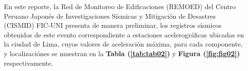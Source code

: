 \documentclass[11pt, a4paper]{report}
\begin{document}
\begin{figure}[H]
\begin{multicols}{2}
        \begin{minipage}[c]{8.2cm}
            \centering %
            \setlength\fboxsep{0pt}
            \setlength\fboxrule{0.3pt}
              \label{fig:fig01}
        \end{minipage}
    \end{multicols} 
\end{figure}

\vspace{1cm}

\noindent
En este reporte, la Red de Monitoreo de Edificaciones (REMOED) del Centro Peruano Japonés de Investigaciones Sísmicas y Mitigación
de Desastres (CISMID) FIC-UNI presenta de manera preliminar, los registros sísmicos obtenidos de este evento correspondiente a 
 estaciones acelerográficas ubicadas en la ciudad de Lima, cuyos valores de aceleración máxima, para cada 
componente, y localizaciónes se muestran en la \textbf{Tabla (\ref{tab:tab02})} y \textbf{Figura (\ref{fig:fig02})} respectivamente.\\
\end{document}
